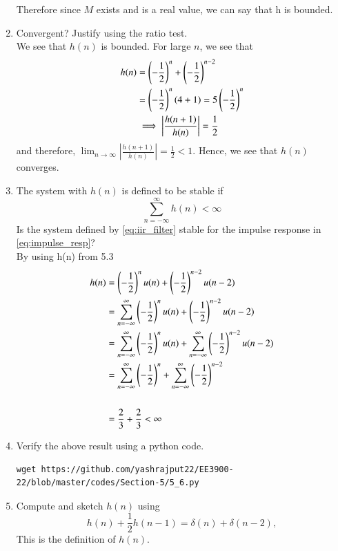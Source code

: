 \documentclass[journal,12pt,twocolumn]{IEEEtran}
\renewcommand\thesection{\arabic{section}}
\begin{document}
\begin{enumerate}[label=\thesection.\arabic*]
Therefore since $M$ exists and is a real value, we can say that h is bounded.
%
\item Convergent? Justify using the ratio test.
\\
\solution
We see that $h(n)$ is bounded. For large $n$, we see that 
\begin{align}
	h(n) &= \left(-\frac{1}{2}\right)^n + \left(-\frac{1}{2}\right)^{n - 2} \\
		 &= \left(-\frac{1}{2}\right)^{n}\left(4 + 1\right) = 5\left(-\frac{1}{2}\right)^n \\
		 &\implies \left|\frac{h(n + 1)}{h(n)}\right| = \frac{1}{2}
\end{align}
and therefore, $\lim_{n \to \infty}\left|\frac{h(n + 1)}{h(n)}\right| = \frac{1}{2} < 1$. Hence, we see that $h(n)$ converges.
\item The system with $h(n)$ is defined to be stable if
\begin{equation}
\sum_{n=-\infty}^{\infty}h(n) < \infty
\end{equation}
Is the system defined by \eqref{eq:iir_filter} stable for the impulse response in \eqref{eq:impulse_resp}?
\\
\solution By using h(n) from 5.3
\begin{align}
h(n) &= \left(-\frac{1}{2}\right)^{n}u(n) + \left(-\frac{1}{2}\right)^{n-2}u(n-2)
\\
&= \sum_{n=-\infty}^{\infty} \left(-\frac{1}{2}\right)^{n}u(n) + \left(-\frac{1}{2}\right)^{n-2}u(n-2)
\\
&= \sum_{n=-\infty}^{\infty} \left(-\frac{1}{2}\right)^{n}u(n) + \sum_{n=-\infty}^{\infty}  \left(-\frac{1}{2}\right)^{n-2}u(n-2) 
\\
&= \sum_{n=-\infty}^{\infty} \left(-\frac{1}{2}\right)^{n} + \sum_{n=-\infty}^{\infty}  \left(-\frac{1}{2}\right)^{n-2}
\\
\\
&= \frac{2}{3} + \frac{2}{3} < \infty 
\end{align}
%
\item Verify the above result using a python code.
\solution
\begin{lstlisting}
wget https://github.com/yashrajput22/EE3900-22/blob/master/codes/Section-5/5_6.py
\end{lstlisting}
\item 
Compute and sketch $h(n)$ using 
\begin{equation}
\label{eq:iir_filter_h}
h(n) + \frac{1}{2}h(n-1) = \delta(n) + \delta(n-2), 
\end{equation}
%
This is the definition of $h(n)$.
\\

\end{enumerate}
\end{document}
